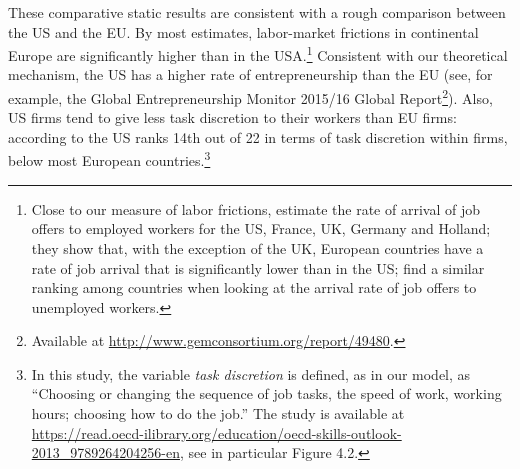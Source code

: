 \documentclass[12pt,american]{paper}
\theoremstyle{remark}
\begin{document}
These comparative static results are consistent with a rough comparison between the US and the EU.  By most estimates, labor-market frictions in continental Europe are significantly higher than in the USA.\footnote{%
Close to our measure of labor frictions, \citet{ridder2003measuring} estimate the rate of arrival of job offers to employed workers for the US, France, UK, Germany and Holland; they show that, with the exception of the UK, European countries have a rate of job arrival that is significantly lower than in the US; \citet*{layard2005unemployment} find a similar ranking among countries when looking at the arrival rate of job offers to unemployed workers.
 }  Consistent with our theoretical mechanism, the US has a higher rate of entrepreneurship than the EU (see, for example, the Global Entrepreneurship Monitor 2015/16 Global Report\footnote{%
  Available at \href{url}{http://www.gemconsortium.org/report/49480}.
 }). Also, US firms tend to give less task discretion to their workers than EU firms: according to \cite{oecd2013} the US ranks 14th out of 22 in terms of task discretion within firms, below most European countries.\footnote{%
 In this study, the variable \textit{task discretion} is defined, as in our model, as ``Choosing or changing the sequence of job tasks, the speed of work, working hours; choosing how to do the job.'' The study is available at \url{https://read.oecd-ilibrary.org/education/oecd-skills-outlook-2013_9789264204256-en}, see in particular Figure 4.2.
 } 


\end{document}

